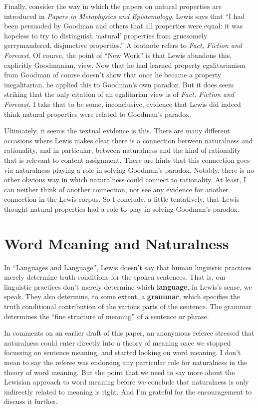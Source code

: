 Finally, consider the way in which the papers on natural properties are introduced in \textit{Papers in Metaphysics and Epistemology}. Lewis says that ``I had been persuaded by Goodman and others that all properties were equal: it was hopeless to try to distinguish `natural' properties from gruesomely gerrymandered, disjunctive properties.'' \citep[1-2]{Lewis1999a} A footnote refers to \textit{Fact, Fiction and Forecast}. Of course, the point of ``New Work'' is that Lewis abandons this, explicitly Goodmanian, view. Now that he had learned property egalitarianism from Goodman of course doesn't show that once he became a property inegalitarian, he applied this to Goodman's own paradox. But it does seem striking that the only citation of an egalitarian view is of \textit{Fact, Fiction and Forecast}. I take that to be some, inconclusive, evidence that Lewis did indeed think natural properties were related to Goodman's paradox.

Ultimately, it seems the textual evidence is this. There are many different occasions where Lewis makes clear there is a connection between naturalness and rationality, and in particular, between naturalness and the kind of rationality that is relevant to content assignment. There are hints that this connection goes via naturalness playing a role in solving Goodman's paradox. Notably, there is no other obvious way in which naturalness could connect to rationality. At least, I can neither think of another connection, nor see any evidence for another connection in the Lewis corpus. So I conclude, a little tentatively, that Lewis thought natural properties had a role to play in solving Goodman's paradox.

\section{Word Meaning and Naturalness}

In ``Languages and Language'', Lewis doesn't say that human linguistic practices merely determine truth conditions for the spoken sentences. That is, our linguistic practices don't merely determine which \textbf{language}, in Lewis's sense, we speak. They also determine, to some extent, a \textbf{grammar}, which specifies the truth conditional contribution of the various parts of the sentence. The grammar determines the ``fine structure of meaning'' \citep[177]{Lewis1975b} of a sentence or phrase. 

In comments on an earlier draft of this paper, an anonymous referee stressed that naturalness could enter directly into a theory of meaning once we stopped focussing on sentence meaning, and started looking on word meaning. I don't mean to say the referee was endorsing any particular role for naturalness in the theory of word meaning. But the point that we need to say more about the Lewisian approach to word meaning before we conclude that naturalness is only indirectly related to meaning is right. And I'm grateful for the encouragement to discuss it further.

